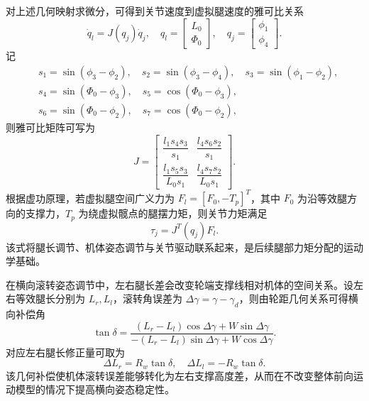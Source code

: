 \documentclass[type=bachelor]{bithesis}
\begin{document}
对上述几何映射求微分，可得到关节速度到虚拟腿速度的雅可比关系
\begin{equation}
  \dot{q}_l=J(q_j)\dot{q}_j,\quad
  q_l=\begin{bmatrix}L_0\\\Phi_0\end{bmatrix},\quad
  q_j=\begin{bmatrix}\phi_1\\\phi_4\end{bmatrix}.
\end{equation}
记
\begin{equation}
\begin{aligned}
  &s_1=\sin(\phi_3-\phi_2),\quad
  s_2=\sin(\phi_3-\phi_4),\quad
  s_3=\sin(\phi_1-\phi_2),\\
  &s_4=\sin(\Phi_0-\phi_3),\quad
  s_5=\cos(\Phi_0-\phi_3),\\
  &s_6=\sin(\Phi_0-\phi_2),\quad
  s_7=\cos(\Phi_0-\phi_2),
\end{aligned}
\end{equation}
则雅可比矩阵可写为
\begin{equation}
  J=
  \begin{bmatrix}
    \dfrac{l_1s_4s_3}{s_1} & \dfrac{l_4s_6s_2}{s_1}\\[8pt]
    \dfrac{l_1s_5s_3}{L_0s_1} & \dfrac{l_4s_7s_2}{L_0s_1}
  \end{bmatrix}.
\end{equation}
根据虚功原理，若虚拟腿空间广义力为 $F_l=[F_0,-T_p]^T$，其中 $F_0$ 为沿等效腿方向的支撑力，$T_p$ 为绕虚拟髋点的腿摆力矩，则关节力矩满足
\begin{equation}
  \tau_j=J^T(q_j)F_l .
\end{equation}
该式将腿长调节、机体姿态调节与关节驱动联系起来，是后续腿部力矩分配的运动学基础。

在横向滚转姿态调节中，左右腿长差会改变轮端支撑线相对机体的空间关系。设左右等效腿长分别为 $L_r,L_l$，滚转角误差为 $\Delta\gamma=\gamma-\gamma_d$，则由轮距几何关系可得横向补偿角
\begin{equation}
  \tan\delta=
  \frac{(L_r-L_l)\cos\Delta\gamma+W\sin\Delta\gamma}
  {-(L_r-L_l)\sin\Delta\gamma+W\cos\Delta\gamma}.
\end{equation}
对应左右腿长修正量可取为
\begin{equation}
  \Delta L_r=R_w\tan\delta,\quad
  \Delta L_l=-R_w\tan\delta .
\end{equation}
该几何补偿使机体滚转误差能够转化为左右支撑高度差，从而在不改变整体前向运动模型的情况下提高横向姿态稳定性。
\end{document}
